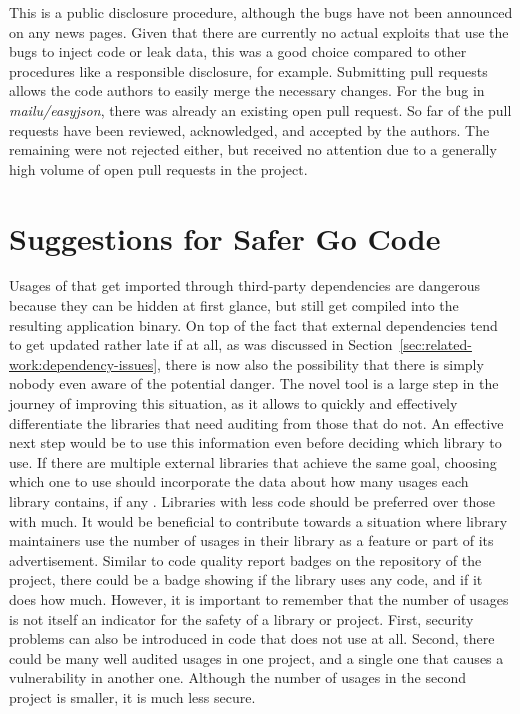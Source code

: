 

This is a public disclosure procedure, although the bugs have not been announced on any news pages.
Given that there are currently no actual exploits that use the bugs to inject code or leak data, this was a good choice
compared to other procedures like a responsible disclosure, for example.
Submitting \github{} pull requests allows the code authors to easily merge the necessary changes.
For the bug in \textit{mailu/easyjson}, there was already an existing open pull request.
So far \numberPRsMerged{} of the pull requests have been reviewed, acknowledged, and accepted by the authors.
The remaining were not rejected either, but received no attention due to a generally high volume of open pull requests
in the project.



\section{Suggestions for Safer Go Code}\label{sec:discussion:safer-go-code}

Usages of \unsafe{} that get imported through third-party dependencies are dangerous because they can be hidden at first
glance, but still get compiled into the resulting application binary.
On top of the fact that external dependencies tend to get updated rather late if at all, as was discussed in
Section~\ref{sec:related-work:dependency-issues}, there is now also the possibility that there is simply nobody even
aware of the potential danger.
The novel tool \toolGeiger{} is a large step in the journey of improving this situation, as it allows to quickly and
effectively differentiate the libraries that need auditing from those that do not.
An effective next step would be to use this information even before deciding which library to use.
If there are multiple external libraries that achieve the same goal, choosing which one to use should incorporate the
data about how many \unsafe{} usages each library contains, if any .
Libraries with less \unsafe{} code should be preferred over those with much.
It would be beneficial to contribute towards a situation where library maintainers use the number of \unsafe{} usages
in their library as a feature or part of its advertisement.
Similar to code quality report badges on the \github{} repository of the project, there could be a badge showing if the
library uses any \unsafe{} code, and if it does how much.
However, it is important to remember that the number of \unsafe{} usages is not itself an indicator for the safety of
a library or project.
First, security problems can also be introduced in code that does not use \unsafe{} at all.
Second, there could be many well audited \unsafe{} usages in one project, and a single one that causes a vulnerability
in another one.
Although the number of \unsafe{} usages in the second project is smaller, it is much less secure.

